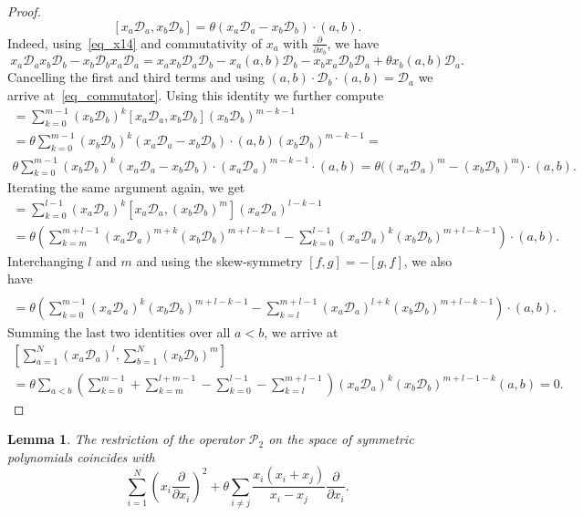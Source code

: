 \documentclass[11pt]{article}
\newtheorem{lemma}[theo]{Lemma}
\theoremstyle{definition}
\numberwithin{equation}{section}
\newcommand{\D}{\mathcal D}
\newcommand{\PP}{\mathcal P}
\begin{document}
\begin{proof}
\begin{equation}
 \label{eq_commutator}
  [x_a \D_a, x_b \D_b]=  \theta (x_a \D_a - x_b \D_b) \cdot (a,b).
\end{equation}
Indeed, using~\eqref{eq_x14} and commutativity of $x_a$ with $\frac{\partial}{\partial x_b}$, we have
$$
 x_a \D_a x_b \D_b - x_b \D_b x_a \D_a= x_a x_b \D_a \D_b - x_a (a,b) \D_b - x_b x_a \D_b \D_a +\theta x_b (a,b) \D_a.
$$
Cancelling the first and third terms and using $(a,b) \cdot  \D_b \cdot (a,b)=\D_a$ we arrive at~\eqref{eq_commutator}. Using this identity we further compute
\begin{multline}
[x_a \D_a, (x_b \D_b)^m]=\sum_{k=0}^{m-1} (x_b \D_b)^k [x_a \D_a,x_b \D_b] (x_b\D_b)^{m-k-1}\\=\theta \sum_{k=0}^{m-1} (x_b \D_b)^k (x_a \D_a - x_b \D_b) \cdot (a,b) (x_b\D_b)^{m-k-1}= \\ \theta \sum_{k=0}^{m-1} (x_b \D_b)^k (x_a \D_a - x_b \D_b) \cdot (x_a\D_a)^{m-k-1} \cdot  (a,b)=
\theta \bigl((x_a \D_a)^m - (x_b \D_b)^m\bigr) \cdot (a,b).
\end{multline}
Iterating the same argument again, we get
\begin{multline*}
[(x_a \D_a)^l, (x_b \D_b)^m]=\sum_{k=0}^{l-1} (x_a \D_a)^k [x_a \D_a,(x_b \D_b)^m] (x_a\D_a)^{l-k-1}\\
=\theta  \left(  \sum_{k=m}^{m+l-1} (x_a \D_a)^{m+k} (x_b\D_b)^{m+l-k-1}  - \sum_{k=0}^{l-1} (x_a \D_a)^k (x_b \D_b)^{m+l-k-1}\right)  \cdot (a,b).
\end{multline*}
Interchanging $l$ and $m$ and using the skew-symmetry $[f,g]=-[g,f]$, we also have
\begin{multline*}
[(x_b \D_b)^l, (x_a \D_a)^m]\\ =\theta  \left( \sum_{k=0}^{m-1} (x_a \D_a)^k (x_b \D_b)^{m+l-k-1}- \sum_{k=l}^{m+l-1} (x_a \D_a)^{l+k} (x_b\D_b)^{m+l-k-1}\right)  \cdot (a,b).
\end{multline*}
Summing the last two identities over all $a<b$, we arrive at
\begin{multline}
 \left[\sum_{a=1}^N(x_a \D_a)^l, \sum_{b=1}^N(x_b \D_b)^m\right]\\ =\theta \sum_{a<b} \left(\sum_{k=0}^{m-1} + \sum_{k=m}^{l+m-1} -\sum_{k=0}^{l-1} -\sum_{k=l}^{m+l-1} \right) (x_a \D_a)^k (x_b \D_b)^{m+l-1-k} (a,b)=0.
\end{multline}
\end{proof}
\begin{lemma}\label{Lemma_CMS}
 The restriction of the operator $\PP_2$ on the space of symmetric polynomials coincides with
 \begin{equation} \label{eq_CMS}
   \sum_{i=1}^N \left(x_i \frac{\partial}{\partial x_i}\right)^2 + \theta \sum_{i\ne j} \frac{ x_i(x_i+x_j)}{x_i-x_j} \frac{\partial}{\partial x_i}.
 \end{equation}
\end{lemma}
\end{document}

